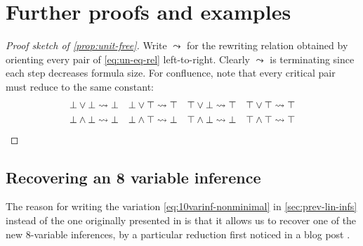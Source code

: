 \documentclass[a4paper, UKenglish, cleveref]{lipics-v2019}
\begin{document}



\appendix

\section{Further proofs and examples}
\label{sect:app:further-proofs-examples}

\begin{proof}
[Proof sketch of \cref{prop:unit-free}]
Write $\leadsto$ for the rewriting relation obtained by orienting every pair of \eqref{eq:un-eq-rel} left-to-right.
Clearly $\leadsto$ is terminating since each step decreases formula size.
For confluence, note that every critical pair must reduce to the same constant:
\begin{equation*}
\begin{alignedat}{4}
&\bot \lor \bot \leadsto \bot &\quad& \bot \lor \top \leadsto \top &\quad& \top \lor \bot \leadsto \top &\quad& \top \lor \top \leadsto \top \\
&\bot \land \bot \leadsto \bot && \bot \land \top \leadsto \bot && \top \land \bot \leadsto \bot && \top \land \top \leadsto \top
\end{alignedat}\qedhere
\end{equation*}
\end{proof}

\subsection{Recovering an 8 variable inference}
\label{sect:reduction-10var-to-8var}
The reason for writing the variation \eqref{eq:10varinf-nonminimal} in \cref{sec:prev-lin-infs} instead of the one originally presented in \cite{Das13:lin-inf-rew} is that it allows us to recover one of the new 8-variable inferences, by a particular reduction first noticed in a blog post \cite{Das20:lin-inf-size-8}.
\end{document}
